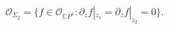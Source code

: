 \begin{equation}\label{srt}
  \mathcal{O}_{\Sigma_2}=\{f\in\mathcal{O}_{\mathbb{C}P^1}:\partial_z
f|_{z_1}=\partial_z f|_{z_2}=0 \}.
\end{equation}

